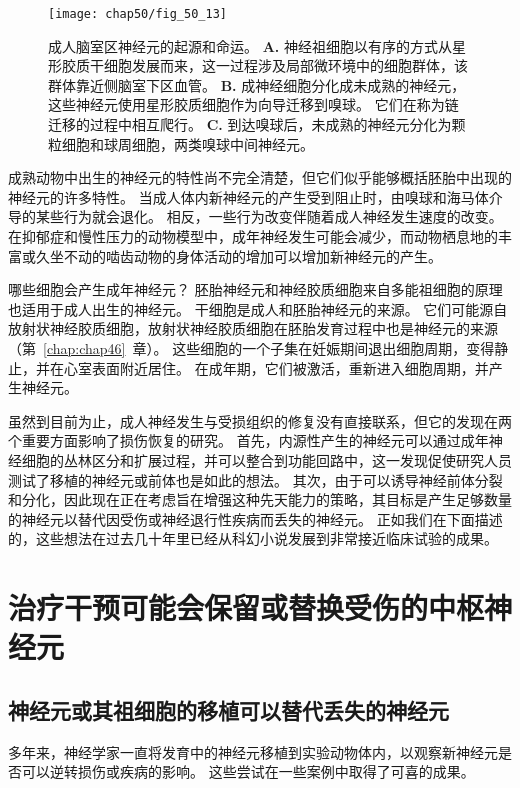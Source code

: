 \begin{figure}[htbp]
	\centering
	\texttt{[image: chap50/fig\_50\_13]}
	\caption{成人脑室区神经元的起源和命运\cite{tavazoie2008specialized}。
		\textbf{A.} 神经祖细胞以有序的方式从星形胶质干细胞发展而来，这一过程涉及局部微环境中的细胞群体，该群体靠近侧脑室下区血管。
		\textbf{B.} 成神经细胞分化成未成熟的神经元，这些神经元使用星形胶质细胞作为向导迁移到嗅球。
		它们在称为链迁移的过程中相互爬行。
		\textbf{C.} 到达嗅球后，未成熟的神经元分化为颗粒细胞和球周细胞，两类嗅球中间神经元。}
	\label{fig:50_13}
\end{figure}


成熟动物中出生的神经元的特性尚不完全清楚，但它们似乎能够概括胚胎中出现的神经元的许多特性。
当成人体内新神经元的产生受到阻止时，由嗅球和海马体介导的某些行为就会退化。
相反，一些行为改变伴随着成人神经发生速度的改变。
在抑郁症和慢性压力的动物模型中，成年神经发生可能会减少，而动物栖息地的丰富或久坐不动的啮齿动物的身体活动的增加可以增加新神经元的产生。


哪些细胞会产生成年神经元？
胚胎神经元和神经胶质细胞来自多能祖细胞的原理也适用于成人出生的神经元。
干细胞是成人和胚胎神经元的来源。
它们可能源自放射状神经胶质细胞，放射状神经胶质细胞在胚胎发育过程中也是神经元的来源（第~\ref{chap:chap46}~章）。
这些细胞的一个子集在妊娠期间退出细胞周期，变得静止，并在心室表面附近居住。
在成年期，它们被激活，重新进入细胞周期，并产生神经元。


虽然到目前为止，成人神经发生与受损组织的修复没有直接联系，但它的发现在两个重要方面影响了损伤恢复的研究。
首先，内源性产生的神经元可以通过成年神经细胞的丛林区分和扩展过程，并可以整合到功能回路中，这一发现促使研究人员测试了移植的神经元或前体也是如此的想法。
其次，由于可以诱导神经前体分裂和分化，因此现在正在考虑旨在增强这种先天能力的策略，其目标是产生足够数量的神经元以替代因受伤或神经退行性疾病而丢失的神经元。
正如我们在下面描述的，这些想法在过去几十年里已经从科幻小说发展到非常接近临床试验的成果。



\section{治疗干预可能会保留或替换受伤的中枢神经元}

\subsection{神经元或其祖细胞的移植可以替代丢失的神经元}

多年来，神经学家一直将发育中的神经元移植到实验动物体内，以观察新神经元是否可以逆转损伤或疾病的影响。
这些尝试在一些案例中取得了可喜的成果。


